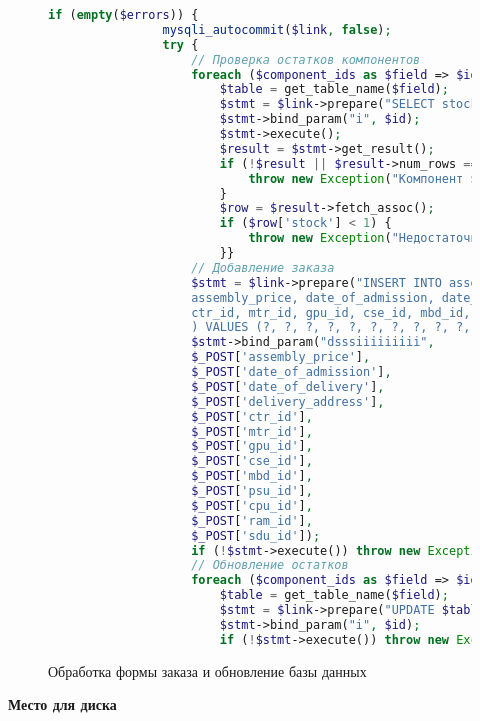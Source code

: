 \begin{figure}[ht]
	\begin{lstlisting}[language=Php]
			if (empty($errors)) {
				mysqli_autocommit($link, false);				
				try {
					// Проверка остатков компонентов
					foreach ($component_ids as $field => $id) {
						$table = get_table_name($field);
						$stmt = $link->prepare("SELECT stock FROM $table WHERE ".get_id_column($table)." = ? FOR UPDATE");
						$stmt->bind_param("i", $id);
						$stmt->execute();
						$result = $stmt->get_result();						
						if (!$result || $result->num_rows === 0) {
							throw new Exception("Компонент $table не найден");
						}						
						$row = $result->fetch_assoc();
						if ($row['stock'] < 1) {
							throw new Exception("Недостаточно $table на складе");
						}}					
					// Добавление заказа
					$stmt = $link->prepare("INSERT INTO assembly (
					assembly_price, date_of_admission, date_of_delivery, delivery_address,
					ctr_id, mtr_id, gpu_id, cse_id, mbd_id, psu_id, cpu_id, ram_id, sdu_id
					) VALUES (?, ?, ?, ?, ?, ?, ?, ?, ?, ?, ?, ?, ?)");					
					$stmt->bind_param("dsssiiiiiiiii",
					$_POST['assembly_price'],
					$_POST['date_of_admission'],
					$_POST['date_of_delivery'],
					$_POST['delivery_address'],
					$_POST['ctr_id'],
					$_POST['mtr_id'],
					$_POST['gpu_id'],
					$_POST['cse_id'],
					$_POST['mbd_id'],
					$_POST['psu_id'],
					$_POST['cpu_id'],
					$_POST['ram_id'],
					$_POST['sdu_id']);	
					if (!$stmt->execute()) throw new Exception("Ошибка оформления: ".$stmt->error);
					// Обновление остатков
					foreach ($component_ids as $field => $id) {
						$table = get_table_name($field);
						$stmt = $link->prepare("UPDATE $table SET stock = stock - 1 WHERE ".get_id_column($table)." = ?");
						$stmt->bind_param("i", $id);
						if (!$stmt->execute()) throw new Exception("Ошибка обновления: ".$stmt->error);}
	\end{lstlisting}
\caption{Обработка формы заказа и обновление базы данных}
\label{fig:orderform_part3}
\end{figure}

\clearpage
\begin{center}
\textbf{Место для диска}
\end{center}
\fi

